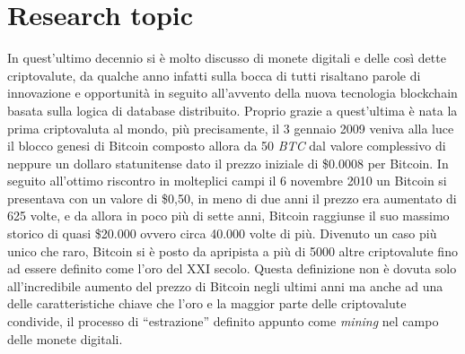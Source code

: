 \documentclass[
11pt, %
oneside, %
italian, %
onehalfspacing,%
headsepline, %
]{MastersDoctoralThesis} %
\begin{document}
{\chapter{Research topic}}
In quest'ultimo decennio si è molto discusso di monete digitali e delle così dette criptovalute, da qualche anno infatti sulla bocca di tutti risaltano parole di innovazione e opportunità in seguito all'avvento della nuova tecnologia blockchain basata sulla logica di database distribuito. Proprio grazie a quest'ultima è nata la prima criptovaluta al mondo, più precisamente, il 3 gennaio 2009 veniva alla luce il blocco genesi di Bitcoin composto allora da 50 \emph{BTC} dal valore complessivo di neppure un dollaro statunitense dato il prezzo iniziale di \$0.0008 per Bitcoin. In seguito all'ottimo riscontro in molteplici campi il 6 novembre 2010 un Bitcoin si presentava con un valore di \$0,50, in meno di due anni il prezzo era aumentato di 625 volte, e da allora in poco più di sette anni, Bitcoin raggiunse il suo massimo storico di quasi \$20.000 ovvero circa 40.000 volte di più. Divenuto un caso più unico che raro, Bitcoin si è posto da apripista a più di 5000 altre criptovalute fino ad essere definito come l'oro del \RN{21} secolo. Questa definizione non è dovuta solo all'incredibile aumento del prezzo di Bitcoin negli ultimi anni ma anche ad una delle caratteristiche chiave che l'oro e la maggior parte delle criptovalute condivide, il processo di ``estrazione'' definito appunto come \emph{mining} nel campo delle monete digitali.\\
\end{document}

